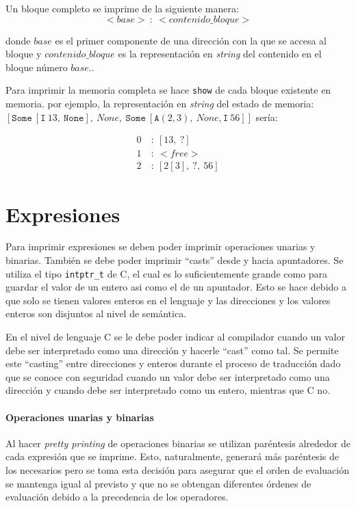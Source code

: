 Un bloque completo se imprime de la siguiente manera:
\begin{equation*}
<base>\ :\ <contenido\_bloque> 
\end{equation*}

donde $base$ es el primer componente de una dirección con la que se accesa al bloque y $contenido\_bloque$ es la representación en \textit{string} del contenido en el bloque número $base$..

Para imprimir la memoria completa se hace \verb|show| de cada bloque existente en memoria.
por ejemplo, la representación en \textit{string} del estado de memoria: $[\mathtt{Some}\ [\mathtt{I}\ 13,\ \mathtt{None}],\ None,\ \mathtt{Some}\ [\mathtt{A}(2,3),\ None, \mathtt{I}\ 56]]$ sería:

\begin{align*}
0\ &:\ [13,\ ?] \\
1\ &:\ <free> \\
2\ &:\ [2[3],\ ?,\ 56]
\end{align*}


\section{Expresiones}

Para imprimir expresiones se deben poder imprimir operaciones unarias y binarias.
También se debe poder imprimir ``casts'' desde y hacia apuntadores.
Se utiliza el tipo \verb|intptr_t| de C, el cual es lo suficientemente grande como para guardar el valor de un entero asi como el de un apuntador.
Esto se hace debido a que solo se tienen valores enteros en el lenguaje y las direcciones y los valores enteros son disjuntos al nivel de semántica.

En el nivel de lenguaje C se le debe poder indicar al compilador cuando un valor debe ser interpretado como una dirección y hacerle ``cast'' como tal.
Se permite este ``casting'' entre direcciones y enteros durante el proceso de traducción dado que se conoce con seguridad cuando un valor debe ser interpretado como una dirección y cuando debe ser interpretado como un entero, mientras que C no.

\paragraph*{Operaciones unarias y binarias}
Al hacer \textit{pretty printing} de operaciones binarias se utilizan paréntesis alrededor de cada expresión que se imprime.
Esto, naturalmente, generará más paréntesis de los necesarios pero se toma esta decisión para asegurar que el orden de evaluación se mantenga igual al previsto y que no se obtengan diferentes órdenes de evaluación debido a la precedencia de los operadores.

